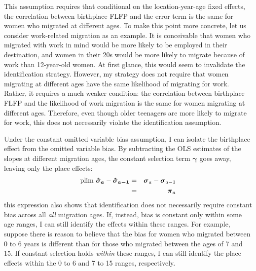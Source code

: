 This assumption requires that conditional on the location-year-age fixed effects, the correlation between birthplace FLFP and the error term is the same for women who migrated at different ages. To make this point more concrete, let us consider work-related migration as an example. It is conceivable that women who migrated with work in mind would be more likely to be employed in their destination, and women in their 20s would be more likely to migrate because of work than 12-year-old women. At first glance, this would seem to invalidate the identification strategy. However, my strategy does not require that women migrating at different ages have the same likelihood of migrating for work. Rather, it requires a much weaker condition: the correlation between birthplace FLFP and the likelihood of work migration is the same for women migrating at different ages. Therefore, even though older teenagers are more likely to migrate for work, this does not necessarily violate the identification assumption. 

Under the constant omitted variable bias assumption, I can isolate the birthplace effect from the omitted variable bias. By subtracting the OLS estimates of the slopes at different migration ages, the constant selection term $\boldsymbol\gamma$ goes away, leaving only the place effects:
\begin{eqnarray}
	\text{plim } \boldsymbol{\hat\sigma_{a}}-\boldsymbol{\hat\sigma_{a-1}}&=&\boldsymbol\sigma_{a}-\boldsymbol\sigma_{a-1}\notag\\
	&=&\boldsymbol\pi_a
\end{eqnarray}
this expression also shows that identification does not necessarily require constant bias across all \textit{all} migration ages. If, instead, bias is constant only within some age ranges, I can still identify the effects within these ranges. For example, suppose there is reason to believe that the bias for women who migrated between 0 to 6 years is different than for those who migrated between the ages of 7 and 15. If constant selection holds \textit{within} these ranges, I can still identify the place effects within the 0 to 6 and 7 to 15 ranges, respectively. 


